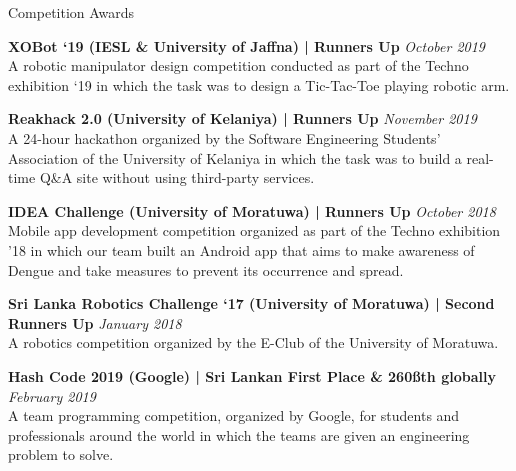 \documentclass{cv}
\begin{document}
\begin{rSection}{Competition Awards}
{        {\bf XOBot `19 (IESL \& University of Jaffna) | Runners Up}                     \hfill {\em October 2019}
        \\A robotic manipulator design competition conducted as part of the Techno exhibition `19 in which the task was to design a Tic-Tac-Toe playing robotic arm.\par

        {\bf Reakhack 2.0 (University of Kelaniya) | Runners Up}                        \hfill {\em November 2019}
        \\A 24-hour hackathon organized by the Software Engineering Students’ Association of the University of Kelaniya in which the task was to build a real-time Q\&A site without using third-party services.\par

        {\bf IDEA Challenge (University of Moratuwa) | Runners Up}                      \hfill {\em October 2018}
        \\Mobile app development competition organized as part of the Techno exhibition '18 in which our team built an Android app that aims to make awareness of Dengue and take measures to prevent its occurrence and spread.\par

        {\bf Sri Lanka Robotics Challenge `17 (University of Moratuwa) | Second Runners Up} \hfill {\em January 2018}
        \\A robotics competition organized by the E-Club of the University of Moratuwa.\par

        {\bf Hash Code 2019 (Google) | Sri Lankan First Place \& 260\ss{th} globally}   \hfill {\em February 2019}
        \\A team programming competition, organized by Google, for students and professionals around the world in which the teams are given an engineering problem to solve.
    }\end{rSection}

\end{document}
